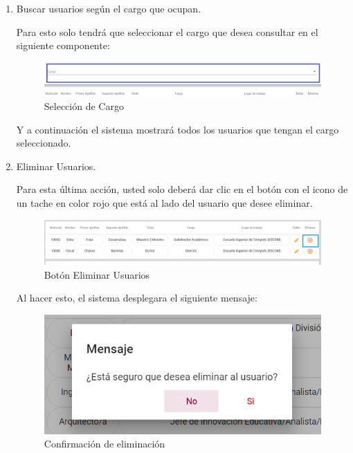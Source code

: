        \begin{enumerate}
        
            \item   Buscar usuarios según el cargo que ocupan.
        
                Para esto solo tendrá que seleccionar el cargo que desea consultar en el siguiente componente:
            
                \begin{figure}[!hbtp]
                    \centering
                    \hypertarget{cargo1}{\includegraphics[width=0.7\linewidth]{images/SP5/BtnCargo1}}
                    \caption{Selección de Cargo}
                    \label{cargo1}
                \end{figure}
            
                 Y a continuación el sistema mostrará todos los usuarios que tengan el cargo seleccionado.
                
            
                
            \item Eliminar Usuarios.
            
                Para esta última acción, usted solo deberá dar clic en el botón con el icono de un tache en color rojo que está al lado del usuario que desee  eliminar. 
            
                \begin{figure}[!hbtp]
                    \centering
                    \hypertarget{eliminar}{\includegraphics[width=0.7\linewidth]{images/SP5/BtnEliminar}}
                    \caption{Botón Eliminar Usuarios}
                    \label{eliminar}
                \end{figure}
            
                Al hacer esto, el sistema desplegara el siguiente mensaje:
                
               \begin{figure}[!hbtp]
                	\centering
                	\includegraphics[width=0.4\linewidth]{images/SP5/MSG22}
               	\caption{Confirmación de eliminación}
               	\label{confirmarE}
                

\end{figure}
\end{enumerate}
